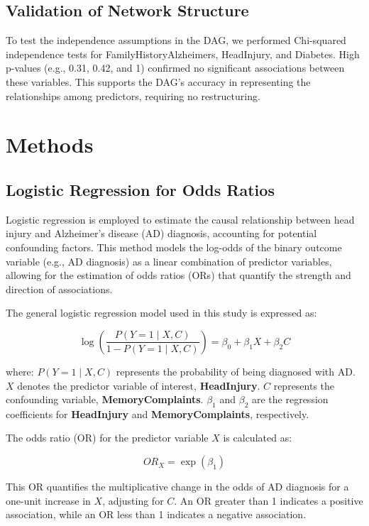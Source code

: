 \documentclass[12pt]{article}
\begin{document}
\subsection{Validation of Network Structure} To test the independence assumptions in the DAG, we performed Chi-squared independence tests for FamilyHistoryAlzheimers, HeadInjury, and Diabetes. High p-values (e.g., 0.31, 0.42, and 1) confirmed no significant associations between these variables. This supports the DAG's accuracy in representing the relationships among predictors, requiring no restructuring.

\section{Methods}


\subsection{Logistic Regression for Odds Ratios}

Logistic regression is employed to estimate the causal relationship between head injury and Alzheimer's disease (AD) diagnosis, accounting for potential confounding factors. This method models the log-odds of the binary outcome variable (e.g., AD diagnosis) as a linear combination of predictor variables, allowing for the estimation of odds ratios (ORs) that quantify the strength and direction of associations.

The general logistic regression model used in this study is expressed as:

\begin{equation}
    \log \left( \frac{P(Y=1 \mid X, C)}{1 - P(Y=1 \mid X, C)} \right) = \beta_0 + \beta_1 X + \beta_2 C
\end{equation}

where:
\( P(Y=1 \mid X, C) \) represents the probability of being diagnosed with AD.
\( X \) denotes the predictor variable of interest, \textbf{HeadInjury}.
\( C \) represents the confounding variable, \textbf{MemoryComplaints}.
\( \beta_1 \) and \( \beta_2 \) are the regression coefficients for \textbf{HeadInjury} and \textbf{MemoryComplaints}, respectively.

The odds ratio (OR) for the predictor variable \( X \) is calculated as:

\[
OR_X = \exp(\beta_1)
\]

This OR quantifies the multiplicative change in the odds of AD diagnosis for a one-unit increase in \( X \), adjusting for \( C \). An OR greater than 1 indicates a positive association, while an OR less than 1 indicates a negative association.
\end{document}
